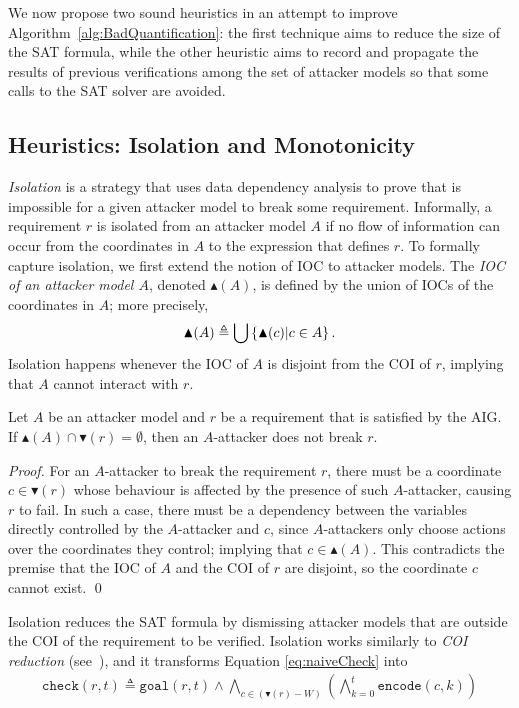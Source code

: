 We now propose two sound heuristics in an attempt to improve Algorithm~\ref{alg:BadQuantification}: the first technique aims to reduce the size of the SAT formula, while the other heuristic aims to record and propagate the results of previous verifications among the set of attacker models so that some calls to the SAT solver are avoided.

\subsection{Heuristics: Isolation and Monotonicity}
\emph{Isolation} is a strategy that uses data dependency analysis to prove that is impossible for a given attacker model to break some requirement. Informally, a requirement $r$ is isolated from an attacker model $A$ if no flow of information can occur from the coordinates in $A$ to the expression that defines $r$. To formally capture isolation, we first extend the notion of IOC to attacker models. The \emph{IOC of an attacker model $A$}, denoted $\blacktriangle(A)$, is defined by the union of IOCs of the coordinates in $A$; more precisely, 
\begin{align}
	\blacktriangle(A) \triangleq \bigcup\left\{\blacktriangle(c)|c \in A\right\}.
\end{align}
Isolation happens whenever the IOC of $A$ is disjoint from the COI of $r$, implying that $A$ cannot interact with $r$.
\begin{proposition}[Isolation]
\label{theo:isolation}
Let $A$ be an attacker model and $r$ be a requirement that is satisfied by the AIG. If $\blacktriangle(A)\cap \blacktriangledown(r)=\emptyset$, then an $A$-attacker does not break $r$.\end{proposition}
\begin{proof}

For an $A$-attacker to break the requirement $r$, there must be a coordinate $c \in \blacktriangledown(r)$ whose behaviour is affected by the presence of such $A$-attacker, causing $r$ to fail. In such a case, there must be a dependency between the variables directly controlled by the $A$-attacker and $c$, since $A$-attackers only choose actions over the coordinates they control; implying that $c\in \blacktriangle(A)$. This contradicts the premise that the IOC of $A$ and the COI of $r$ are disjoint, so the coordinate $c$ cannot exist. \qed
\end{proof}

Isolation reduces the SAT formula by dismissing attacker models that are outside the COI of the requirement to be verified. Isolation works similarly to \emph{COI reduction} (see~\cite{ToSplitOrToGroup,GraphLabelingForEfficientCOIComputation,HandbookOfSatisfiability,HandbookOfModelChecking,OptimizedModelCheckingOfMultipleProperties}), and it transforms Equation \ref{eq:naiveCheck} into
\begin{align}
\label{eq:isolation}
\mathtt{check}(r,t)\triangleq\mathtt{goal}(r,t)\land\! \bigwedge_{c\in (\blacktriangledown(r)- W)}\left( \bigwedge_{k=0}^{t}{\mathtt{encode}(c,k)}\right)
\end{align}


